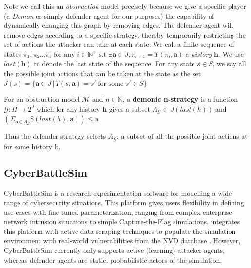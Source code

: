 Note we call this an \textit{obstruction} model precisely because we give a specific player (a \textit{Demon} or simply defender agent for our purposes) the capability of dynamically changing this graph by removing edges. The defender agent will remove edges according to a specific strategy, thereby temporarily restricting the set of actions the attacker can take at each state. We call a finite sequence of states $\pi_{1}, \pi_{2} ... \pi_{i} \text{ for any } i \in \mathbb{N}^{+} \text{ s.t } \exists \mathbf{a}\in J, \pi_{i+1} = T(\pi_{i}, \mathbf{a})$ a \textit{history} $\mathbf{h}$. We use $last(\mathbf{h})$ to denote the last state of the sequence. For any state $s\in S$, we say all the possible joint actions that can be taken at the state as the set $J(s) = \{\mathbf{a}\in J \, | \, T(s, \mathbf{a}) = s' \text{ for some } s' \in S\}$

\begin{definition} For an obstruction model $\mathcal{M}$ and $n \in \mathbb{N}$, a \textbf{demonic n-strategy} is a function $\mathcal{G}: H \rightarrow 2^{J}$ which for any history $\mathbf{h}$ gives a subset $A_{\mathcal{G}} \subset J(last(h))$ and $(\Sigma_{\mathbf{a}\in A_{\mathcal{G}}}\$ (last(h), \mathbf{a})) \leq n$
\end{definition}

Thus the defender strategy selects $A_{\mathcal{G}}$, a subset of all the possible joint actions at for some history $\mathbf{h}$.

\subsection{CyberBattleSim}
\label{sec:CyberBattleSim}
CyberBattleSim \cite{msft:cyberbattlesim} is a research-experimentation software for modelling a wide-range of cybersecurity situations. This platform gives users flexibility in defining use-cases with fine-tuned parameterization, ranging from complex enterprise-network intrusion situations to simple Capture-the-Flag simulations.\cite{ccyberbattle} integrates this platform with active data scraping techniques to populate the simulation environment with real-world vulnerabilities from the NVD database \cite{booth2013national}. However, CyberBattleSim currently only supports active (learning) attacker agents, whereas defender agents are static, probabilistic actors of the simulation.
